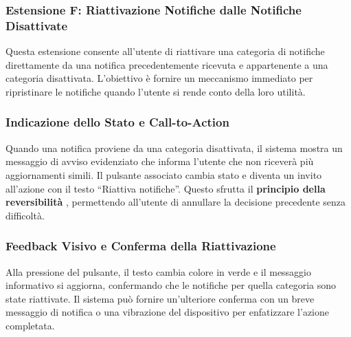 \clearpage
\newpage

\subsubsection{Estensione F: Riattivazione Notifiche dalle Notifiche Disattivate}

Questa estensione consente all’utente di riattivare una categoria di notifiche direttamente da una notifica precedentemente ricevuta e appartenente a una categoria disattivata. L’obiettivo è fornire un meccanismo immediato per ripristinare le notifiche quando l’utente si rende conto della loro utilità.

\vspace{0.5cm}
\subsubsection{Indicazione dello Stato e Call-to-Action}
Quando una notifica proviene da una categoria disattivata, il sistema mostra un messaggio di avviso evidenziato che informa l’utente che non riceverà più aggiornamenti simili. Il pulsante associato cambia stato e diventa un invito all’azione con il testo “Riattiva notifiche”. Questo sfrutta il \textbf{principio della reversibilità} \cite{shneiderman2004}, permettendo all’utente di annullare la decisione precedente senza difficoltà.

\vspace{0.5cm}
\subsubsection{Feedback Visivo e Conferma della Riattivazione}
Alla pressione del pulsante, il testo cambia colore in verde e il messaggio informativo si aggiorna, confermando che le notifiche per quella categoria sono state riattivate. Il sistema può fornire un’ulteriore conferma con un breve messaggio di notifica o una vibrazione del dispositivo per enfatizzare l’azione completata.

\vspace{0.5cm}
